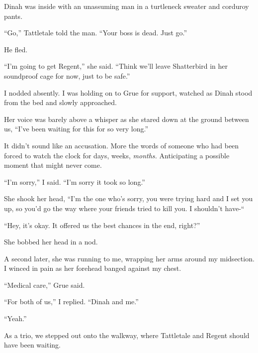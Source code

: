 Dinah was inside with an unassuming man in a turtleneck sweater and corduroy pants.



``Go,'' Tattletale told the man.  ``Your boss is dead.  Just go.''



He fled.



``I'm going to get Regent,'' she said.  ``Think we'll leave Shatterbird in her soundproof cage for now, just to be safe.''



I nodded absently.  I was holding on to Grue for support, watched as Dinah stood from the bed and slowly approached.



Her voice was barely above a whisper as she stared down at the ground between us, ``I've been waiting for this for so very long.''



It didn't sound like an accusation.  More the words of someone who had been forced to watch the clock for days, weeks, \emph{months.  }Anticipating a possible moment that might never come.



``I'm sorry,'' I said.  ``I'm sorry it took so long.''



She shook her head, ``I'm the one who's sorry, you were trying hard and I set you up, so you'd go the way where your friends tried to kill you.  I shouldn't have-``



``Hey, it's okay.  It offered us the best chances in the end, right?''



She bobbed her head in a nod.



A second later, she was running to me, wrapping her arms around my midsection.  I winced in pain as her forehead banged against my chest.



``Medical care,'' Grue said.



``For both of us,'' I replied.  ``Dinah and me.''



``Yeah.''



As a trio, we stepped out onto the walkway, where Tattletale and Regent should have been waiting.



